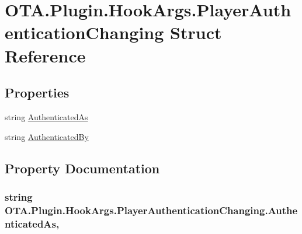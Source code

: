 \hypertarget{struct_o_t_a_1_1_plugin_1_1_hook_args_1_1_player_authentication_changing}{}\section{O\+T\+A.\+Plugin.\+Hook\+Args.\+Player\+Authentication\+Changing Struct Reference}
\label{struct_o_t_a_1_1_plugin_1_1_hook_args_1_1_player_authentication_changing}
\subsection*{Properties}
\begin{DoxyCompactItemize}
\item 
string \hyperlink{struct_o_t_a_1_1_plugin_1_1_hook_args_1_1_player_authentication_changing_a823a50958567d0ad58d7b1fa46d7b46d}{Authenticated\+As}
\item 
string \hyperlink{struct_o_t_a_1_1_plugin_1_1_hook_args_1_1_player_authentication_changing_acf989dbffe08e00632b55962fdd38a4f}{Authenticated\+By}
\end{DoxyCompactItemize}


\subsection{Property Documentation}
\hypertarget{struct_o_t_a_1_1_plugin_1_1_hook_args_1_1_player_authentication_changing_a823a50958567d0ad58d7b1fa46d7b46d}{}
\subsubsection[{Authenticated\+As}]{\setlength{\rightskip}{0pt plus 5cm}string O\+T\+A.\+Plugin.\+Hook\+Args.\+Player\+Authentication\+Changing.\+Authenticated\+As\hspace{0.3cm}{\ttfamily [get]}, {\ttfamily [set]}}\label{struct_o_t_a_1_1_plugin_1_1_hook_args_1_1_player_authentication_changing_a823a50958567d0ad58d7b1fa46d7b46d}
\hypertarget{struct_o_t_a_1_1_plugin_1_1_hook_args_1_1_player_authentication_changing_acf989dbffe08e00632b55962fdd38a4f}{}
